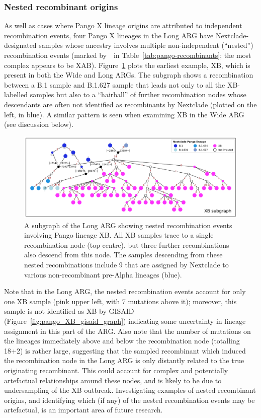 \documentclass{article}
\begin{document}
\subsubsection{Nested recombinant origins}
As well as cases where Pango X lineage origins are attributed to independent
recombination events, four Pango X lineages in the Long ARG have Nextclade-designated
samples whose ancestry involves multiple non-independent (``nested'') recombination events
(marked by~\textdagger ~in Table~\ref{tab:pango-recombinants}; the most
complex appears to be XAB). Figure~\ref{fig:complex_origins_graph} plots the earliest example,
XB,  which is present in both the Wide and Long ARGs. The subgraph shows a recombination
between a B.1 sample and B.1.627 sample that leads not only to all the XB-labelled samples
but also to a ``hairball'' of further recombination nodes whose descendants are often not
identified as recombinants by Nextclade (plotted on the left, in blue). A similar
pattern is seen when examining XB in the Wide ARG (see discussion below).

\begin{figure} \centering
\includegraphics[width=\textwidth]{figures/Pango_XB_nxcld_tight_graph.pdf}
\caption{\label{fig:complex_origins_graph}  A subgraph of the Long ARG showing
nested recombination events involving Pango lineage XB. All XB samples
trace to a single recombination node (top centre), but three further recombinations
also descend from this node. The samples descending from these nested
recombinations include 9 that are assigned by Nextclade to
various non-recombinant pre-Alpha lineages (blue).}
\end{figure}

Note that in the Long ARG, the nested recombination events account for only one
XB sample (pink upper left, with 7 mutations above it); moreover, this sample is
not identified as XB by GISAID (Figure~\ref{fig:pango_XB_gisaid_graph})
indicating some uncertainty in lineage assignment in this part of the ARG.
Also note that the number of mutations on the lineages immediately above and
below the recombination node (totalling 18+2) is rather large, suggesting
that the sampled recombinant which induced the recombination node in the Long ARG
is only distantly related to the true originating recombinant. This could account
for complex and potentially artefactual relationships around these nodes, and
is likely to be due to undersampling of the XB outbreak. Investigating examples
of nested recombinant origins, and identifying which (if any) of the nested
recombination events may be artefactual, is an important area of future research.
\end{document}

